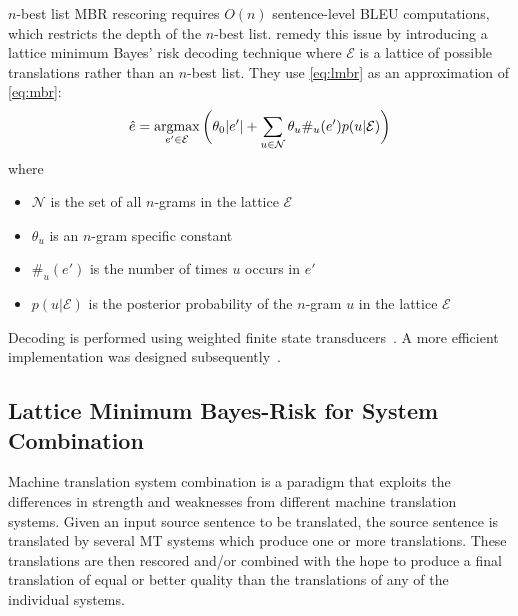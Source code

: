 $n$-best list MBR rescoring requires $O(n)$ sentence-level
BLEU computations, which restricts the depth of the $n$-best list.
\citet{tromble-kumar-och-macherey:2008:EMNLP} remedy this issue
by introducing a
lattice minimum Bayes' risk decoding technique where $\mathcal{E}$ is a lattice
of possible translations rather than an $n$-best list.
They use \autoref{eq:lmbr} as an approximation
of \autoref{eq:mbr}:
%
\begin{equation} \label{eq:lmbr}
  \hat{e} = \operatorname*{argmax}_{e' \in \mathcal{E}} \bigg ( \theta_0 |e'| + \sum_{u \in \mathcal{N}} \theta_u \#_u(e') p(u|\mathcal{E}) \bigg )
\end{equation}
%
where
%
\begin{itemize}
  \item $\mathcal{N}$ is the set of all $n$-grams in the lattice $\mathcal{E}$
  \item $\theta_u$ is an $n$-gram specific constant
  \item $\#_u(e')$ is the number of times $u$ occurs in $e'$
  \item $p(u|\mathcal{E})$ is the posterior probability of the $n$-gram $u$ in the lattice $\mathcal{E}$
\end{itemize}
%
Decoding is performed using weighted finite state
transducers~\citep{tromble-kumar-och-macherey:2008:EMNLP}. A more efficient
implementation was designed
subsequently~\citep{blackwood-degispert-byrne:2010:ACL,blackwood:2010:PHD}.


\subsection{Lattice Minimum Bayes-Risk for System Combination}
\label{sec:lmbrSysComb}

Machine translation system combination is a paradigm that exploits
the differences in strength and weaknesses from different
machine translation systems. Given an input source sentence to be
translated, the source sentence is translated by several MT systems
which produce one or more translations. These translations
are then rescored and/or combined with the hope to produce
a final translation of equal or better quality than the translations
of any of the individual systems.

